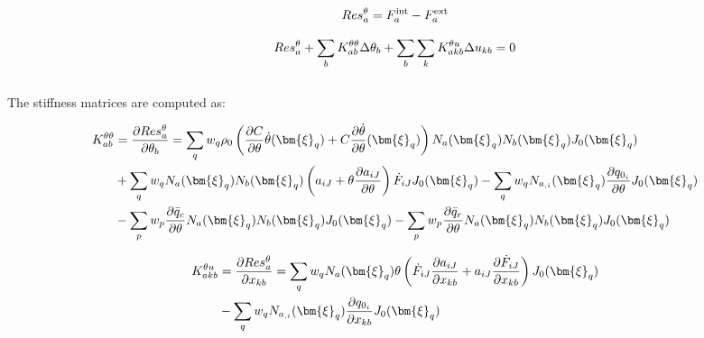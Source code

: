 \documentclass[oneside,11pt,times]{book}
\begin{document}
\begin{equation}
\begin{aligned}
\centering
Res^{\theta}_{a} = {F}^{\text{int}}_a - {F}^{\text{ext}}_a
\end{aligned}
\label{equationResThetaElem}
\end{equation}

\begin{equation}
\begin{aligned}
\centering
Res^{\theta}_a + \sum_b K_{ab}^{\theta\theta}\Delta\theta_b +\sum_b \sum_k K_{akb}^{\theta u}\Delta{u_{kb}}=0
\end{aligned}
\label{equationN-RTheta}
\end{equation}
\\
The stiffness matrices are computed as:

\begin{equation}
\begin{aligned}
\centering
K_{ab}^{\theta\theta} &= \dfrac{\partial{Res^{\theta}_{a}}}{\partial{\theta_b}} = \sum_q w_q\rho_0\left(\dfrac{\partial C}{\partial\theta}\dot{\theta}(\bm{\xi}_q)+C\dfrac{\partial \dot{\theta}}{\partial\theta}(\bm{\xi}_q)\right) N_a(\bm{\xi}_q)N_b(\bm{\xi}_q)J_0(\bm{\xi}_q)\\&+\sum_q w_q N_a(\bm{\xi}_q)N_b(\bm{\xi}_q)\left(a_{iJ}+\theta\dfrac{\partial a_{iJ}}{\partial\theta}\right) \dot{F}_{iJ} J_0(\bm{\xi}_q)-\sum_q w_q N_{a_{,i}}(\bm{\xi}_q)\dfrac{\partial q_{0_i}}{\partial\theta}J_0(\bm{\xi}_q)\\&
-\sum_p w_p\dfrac{\partial{\bar{q}}_c}{\partial\theta} N_a(\bm{\xi}_q)N_b(\bm{\xi}_q)J_0(\bm{\xi}_q) -\sum_p w_p\dfrac{\partial{\bar{q}}_{r}}{\partial\theta} N_a(\bm{\xi}_q)N_b(\bm{\xi}_q)J_0(\bm{\xi}_q)
\end{aligned}
\label{equationKThetaTheta}
\end{equation}

\begin{equation}
\begin{aligned}
\centering
K_{akb}^{\theta u}&=\dfrac{\partial{Res^{\theta}_{a}}}{\partial{x_{kb}}}=\sum_q w_q N_a(\bm{\xi}_q)\theta\left(\dot{F}_{iJ}\dfrac{\partial a_{iJ}}{\partial x_{kb}}+a_{iJ}\dfrac{\partial \dot{F}_{iJ}}{\partial x_{kb}}\right) J_0(\bm{\xi}_q)\\&
-\sum_q w_q N_{a_{,i}}(\bm{\xi}_q)\dfrac{\partial q_{0_i}}{\partial{x_{kb}}}J_0(\bm{\xi}_q)
\end{aligned}
\label{equationKThetau}
\end{equation}
\end{document}

